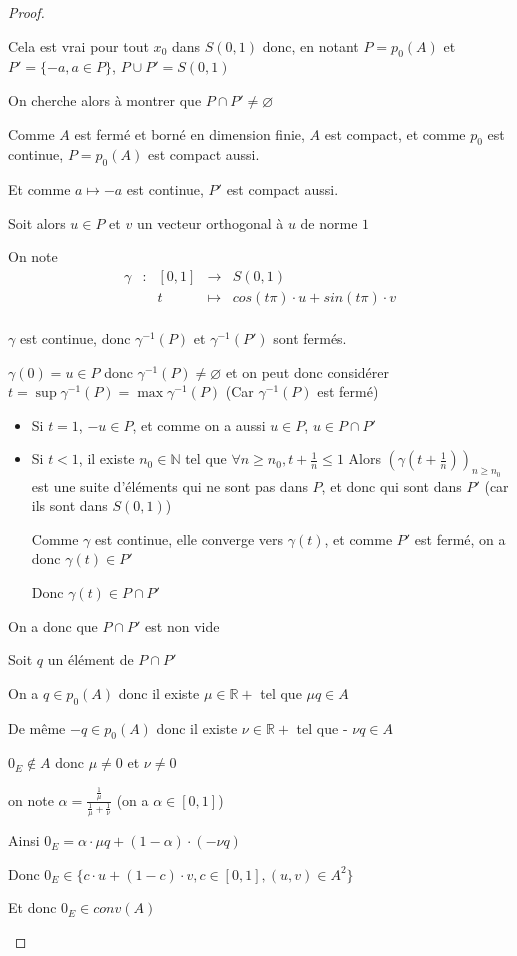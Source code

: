 \documentclass[a4paper]{article}
\begin{document}
\begin{proof}
\begin{itemize}
Cela est vrai pour tout $x_{0}$ dans $S(0, 1)$ donc, en notant $P = p_{0}(A)$ et $P' = \{-a, a \in P \}$, $P \cup P' = S(0, 1)$

\medskip

On cherche alors à montrer que $ P \cap P' \neq \varnothing$

Comme $A$ est fermé et borné en dimension finie, $A$ est compact, et comme $p_{0}$ est continue, $P = p_{0}(A)$ est compact aussi.

Et comme $a \mapsto -a$ est continue, $P'$ est compact aussi.

Soit alors $u \in P$ et $v$ un vecteur orthogonal à $u$ de norme $1$

On note 
\[\begin{array}{ccccl}
\gamma & : & [0, 1] & \to     & S(0, 1) \\
       &   & t      & \mapsto & cos(t\pi) \cdot u + sin(t\pi) \cdot v \\
\end{array}\]

$\gamma$ est continue, donc $\gamma^{-1}(P)$ et $\gamma^{-1}(P')$ sont fermés.

$\gamma(0) = u \in P$ donc $\gamma^{-1}(P) \neq \varnothing$ et on peut donc considérer $t = \sup \gamma^{-1}(P) = \max \gamma^{-1}(P)$ (Car $\gamma^{-1}(P)$ est fermé)

\begin{itemize}
\item Si $t = 1$, $-u \in P$, et comme on a aussi $u \in P$, $u \in P \cap P'$
\item Si $t < 1$, il existe $n_{0} \in \mathbb{N}$ tel que $\forall n \geqslant n_{0}, t + \frac{1}{n} \leqslant 1$
Alors $(\gamma(t + \frac{1}{n}))_{n \geqslant n_{0}}$ est une suite d'éléments qui ne sont pas dans $P$, et donc qui sont dans $P'$ (car ils sont dans $S(0, 1)$)


Comme $\gamma$ est continue, elle converge vers $\gamma(t)$, et comme $P'$ est fermé, on a donc $\gamma(t) \in P'$

Donc $\gamma(t) \in P \cap P'$
\end{itemize}

On a donc que $P \cap P'$ est non vide

\medskip

Soit $q$ un élément de $P \cap P'$

On a $q \in p_{0}(A)$ donc il existe $\mu \in \mathbb{R}+$ tel que $\mu q \in A$

De même $-q \in p_{0}(A)$ donc il existe $\nu \in \mathbb{R}+$ tel que - $\nu q \in A$

$0_{E} \notin A$ donc $\mu \neq 0$ et $\nu \neq 0$

on note $\alpha = \frac{\frac{1}{\mu}}{\frac{1}{\mu} + \frac{1}{\nu}}$ (on a $\alpha \in [0, 1]$)

Ainsi $0_{E} = \alpha \cdot \mu q + (1 - \alpha) \cdot (- \nu  q)$

Donc $0_{E} \in \{c \cdot u + (1 - c) \cdot v, c \in [0, 1], (u, v) \in A^{2} \}$


Et donc $0_{E} \in conv(A)$
\end{itemize}
\end{proof}
\end{document}
